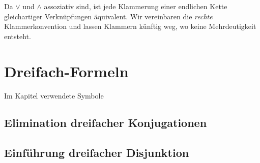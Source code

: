 \documentclass[main.tex]{subfiles}
\begin{document}
\begin{remark}
Da \(\lor\) und \(\land\) assoziativ sind, ist jede Klammerung einer endlichen Kette
gleichartiger Verknüpfungen äquivalent. Wir vereinbaren die \emph{rechte}
Klammerkonvention und lassen Klammern künftig weg, wo keine Mehrdeutigkeit entsteht.
\end{remark}


\section{Dreifach-Formeln}
\begin{DeltaContext}{Im Kapitel verwendete Symbole}
\end{DeltaContext}

\subsection{Elimination dreifacher Konjugationen}

\begin{tabproof}
\end{tabproof}

\begin{tabproof}
\end{tabproof}

\begin{tabproof}
\end{tabproof}

\subsection{Einführung dreifacher Disjunktion}
\end{document}
